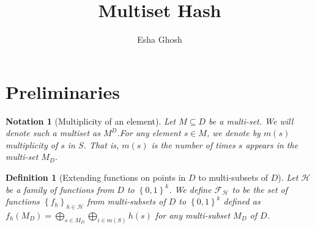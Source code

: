 \documentclass{article}
\title{Multiset Hash}
\author{Esha Ghosh}
\newtheorem{definition}{Definition}
\newtheorem{notation}{Notation}
\newcommand{\hashFamily}{\mathcal{H}}
\newcommand{\funcfamily}{\mathcal{F}}
\newcommand{\XOR}{\bigoplus}
\newcommand{\set}[1]{\left\{ #1 \right\}}
\newcommand{\bits}{\set{0,1}}
\begin{document}
\maketitle

\begin{abstract}

\end{abstract}

\section{Preliminaries}


\begin{notation}[Multiplicity of an element]
 Let $M \subseteq D$ be a multi-set. We will denote such a multiset as $M^D$.For any element $s \in M$, we denote by $m(s)$ multiplicity of $s$ in $S$. That is, $m(s)$ is the number of times $s$ appears in the multi-set $M_D$.
\end{notation}
 
 
\begin{definition}[Extending functions on points in $D$ to  multi-subsets of $D$]
Let $\hashFamily$ be a family of functions from $D$ to $\bits^k$. We define $\funcfamily_\hashFamily$ to be the set of functions $\set{f_h}_{h \in \hashFamily}$ from multi-subsets of $D$ to $\bits^k$  defined as $f_h(M_D)=\XOR_{s\in M_D} \XOR_{i \in m(S)} h(s)$ for any multi-subset $M_D$ of $D$.
\end{definition}
 
\end{document}
